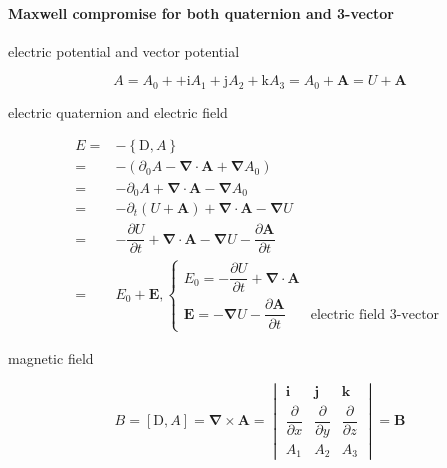 \documentclass[
]{book}
\theoremstyle{definition}
\theoremstyle{definition}
\theoremstyle{definition}
\theoremstyle{definition}
\theoremstyle{remark}
\begin{document}
\hypertarget{maxwell-compromise-for-both-quaternion-and-3-vector}{%
\paragraph{Maxwell compromise for both quaternion and 3-vector}\label{maxwell-compromise-for-both-quaternion-and-3-vector}}

electric potential and vector potential

\[
A=A_{{\scriptscriptstyle 0}}++\mathrm{i}A_{{\scriptscriptstyle 1}}+\mathrm{j}A_{{\scriptscriptstyle 2}}+\mathrm{k}A_{{\scriptscriptstyle 3}}=A_{0}+\boldsymbol{A}=U+\boldsymbol{A}
\]

electric quaternion and electric field

\[
\begin{aligned}
E= & -\left\{ \mathrm{D},A\right\} \\
= & -\left(\partial_{{\scriptscriptstyle 0}}A-\boldsymbol{\nabla}\cdot\boldsymbol{A}+\boldsymbol{\nabla}A_{{\scriptscriptstyle 0}}\right)\\
= & -\partial_{{\scriptscriptstyle 0}}A+\boldsymbol{\nabla}\cdot\boldsymbol{A}-\boldsymbol{\nabla}A_{{\scriptscriptstyle 0}}\\
= & -\partial_{{\scriptscriptstyle t}}\left(U+\boldsymbol{A}\right)+\boldsymbol{\nabla}\cdot\boldsymbol{A}-\boldsymbol{\nabla}U\\
= & -\dfrac{\partial U}{\partial t}+\boldsymbol{\nabla}\cdot\boldsymbol{A}-\boldsymbol{\nabla}U-\dfrac{\partial\boldsymbol{A}}{\partial t}\\
= & E_{{\scriptscriptstyle 0}}+\boldsymbol{E},\begin{cases}
E_{{\scriptscriptstyle 0}}=-\dfrac{\partial U}{\partial t}+\boldsymbol{\nabla}\cdot\boldsymbol{A}\\
\boldsymbol{E}=-\boldsymbol{\nabla}U-\dfrac{\partial\boldsymbol{A}}{\partial t} & \text{electric field 3-vector}
\end{cases}
\end{aligned}
\]

magnetic field

\[
B=\left[\mathrm{D},A\right]=\boldsymbol{\nabla}\times\boldsymbol{A}=\begin{vmatrix}\boldsymbol{i} & \boldsymbol{j} & \boldsymbol{k}\\
\dfrac{\partial}{\partial x} & \dfrac{\partial}{\partial y} & \dfrac{\partial}{\partial z}\\
A_{{\scriptscriptstyle 1}} & A_{{\scriptscriptstyle 2}} & A_{{\scriptscriptstyle 3}}
\end{vmatrix}=\boldsymbol{B}
\]
\end{document}

